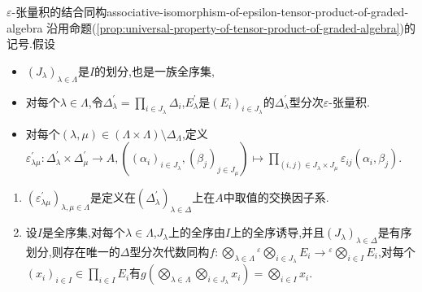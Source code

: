 \begin{proposition}{$\varepsilon$-张量积的结合同构}{associative-isomorphism-of-epsilon-tensor-product-of-graded-algebra}
	沿用命题(\cref{prop:universal-property-of-tensor-product-of-graded-algebra})的记号.假设
	\begin{itemize}
		\item $\left(J_{\lambda}\right)_{\lambda\in\Lambda}$是$I$的划分,也是一族全序集,
		\item 对每个$\lambda\in\Lambda$,令$\Delta_{\lambda}^{\prime}=\prod\limits_{i\in J_{\lambda}}\Delta_{i}$,$E_{\lambda}^{\prime}$是$\left(E_{i}\right)_{i\in J_{\lambda}}$的$\Delta_{\lambda}^{\prime}$型分次$\varepsilon$-张量积.
		\item 对每个$\left(\lambda,\mu\right)\in\left(\Lambda\times\Lambda\right)\setminus\Delta_{\Lambda}$,定义$\varepsilon_{\lambda\mu}^{\prime}:\Delta_{\lambda}^{\prime}\times\Delta_{\mu}^{\prime}\to A,\left(\left(\alpha_{i}\right)_{i\in J_{\lambda}},\left(\beta_{j}\right)_{j\in J_{\mu}}\right)\mapsto\prod\limits_{\left(i,j\right)\in J_{\lambda}\times J_{\mu}}\varepsilon_{ij}\left(\alpha_{i},\beta_{j}\right)$.
	\end{itemize}
	\begin{enumerate}
		\item $\left(\varepsilon_{\lambda\mu}^{\prime}\right)_{\lambda,\mu\in\Lambda}$是定义在$\left(\Delta_{\lambda}^{\prime}\right)_{\lambda\in\Delta}$上在$A$中取值的交换因子系.
		\item 设$I$是全序集,对每个$\lambda\in\Lambda$,$J_{\lambda}$上的全序由$I$上的全序诱导,并且$\left(J_{\lambda}\right)_{\lambda\in\Delta}$是有序划分,则存在唯一的$\Delta$型分次代数同构$f:\bigotimes\limits_{\lambda\in\Lambda}{}^{\varepsilon}\bigotimes\limits_{i\in J_{\lambda}}E_{i}\to{}^{\varepsilon}\bigotimes\limits_{i\in I}E_{i}$,对每个$\left(x_{i}\right)_{i\in I}\in\prod\limits_{i\in I}E_{i}$有$g\left(\bigotimes\limits_{\lambda\in\Lambda}\bigotimes\limits_{i\in J_{\lambda}}x_{i}\right)=\bigotimes\limits_{i\in I}x_{i}$.
	\end{enumerate}
\end{proposition}






































